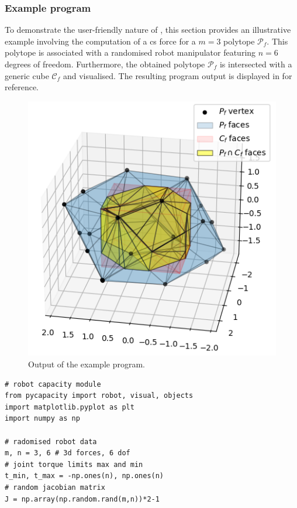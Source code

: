 \subsubsection*{Example program}
{
To demonstrate the user-friendly nature of , this section provides an illustrative example involving the computation of a \gls{cs} force for a $m=3$ polytope $\mathcal{P}_f$. This polytope is associated with a randomised robot manipulator featuring $n=6$ degrees of freedom.  Furthermore, the obtained polytope $\mathcal{P}_f$ is intersected with a generic cube $\mathcal{C}_f$ and visualised. 
The resulting program output is displayed in  for reference.
\begin{figure}
\vspace{7.5cm}
    \centering
    \includegraphics[width=\linewidth]{Papers/images/polytope_example.png}
    \caption{Output of the example program.}
    \label{fig:pycapacity_example}
\end{figure}
\begin{verbatim}
# robot capacity module
from pycapacity import robot, visual, objects
import matplotlib.pyplot as plt
import numpy as np

# radomised robot data
m, n = 3, 6 # 3d forces, 6 dof 
# joint torque limits max and min
t_min, t_max = -np.ones(n), np.ones(n) 
# random jacobian matrix
J = np.array(np.random.rand(m,n))*2-1


\end{verbatim}}
